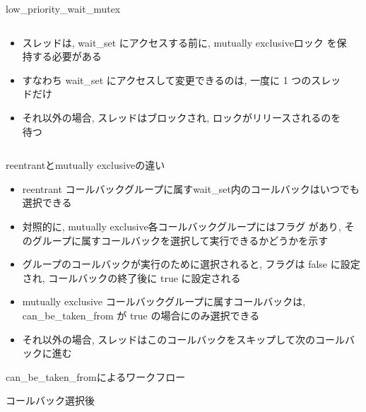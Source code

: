 \begin{frame}{low\_priority\_wait\_mutex}
    \begin{columns}
        \begin{column}{0.6\textwidth}
            \begin{itemize}
                \item スレッドは, wait\_set にアクセスする前に, mutually exclusiveロック  を保持する必要がある
                \item すなわち wait\_set にアクセスして変更できるのは, 一度に 1 つのスレッドだけ
                \item それ以外の場合, スレッドはブロックされ, ロックがリリースされるのを待つ
            \end{itemize}
        \end{column}
        \begin{column}{0.4\textwidth}
        \end{column}
    \end{columns}
\end{frame}

\begin{frame}{reentrantとmutually exclusiveの違い}
    \begin{itemize}
        \item reentrant コールバックグループに属すwait\_set内のコールバックはいつでも選択できる
        \item 対照的に, mutually exclusive各コールバックグループにはフラグ  があり, そのグループに属すコールバックを選択して実行できるかどうかを示す
        \item グループのコールバックが実行のために選択されると, フラグは false に設定され, コールバックの終了後に true に設定される
        \item mutually exclusive コールバックグループに属すコールバックは,  can\_be\_taken\_from が true の場合にのみ選択できる
        \item それ以外の場合, スレッドはこのコールバックをスキップして次のコールバックに進む
    \end{itemize}
\end{frame}

\begin{frame}{can\_be\_taken\_fromによるワークフロー}
\end{frame}

\begin{frame}{コールバック選択後}
\end{frame}

